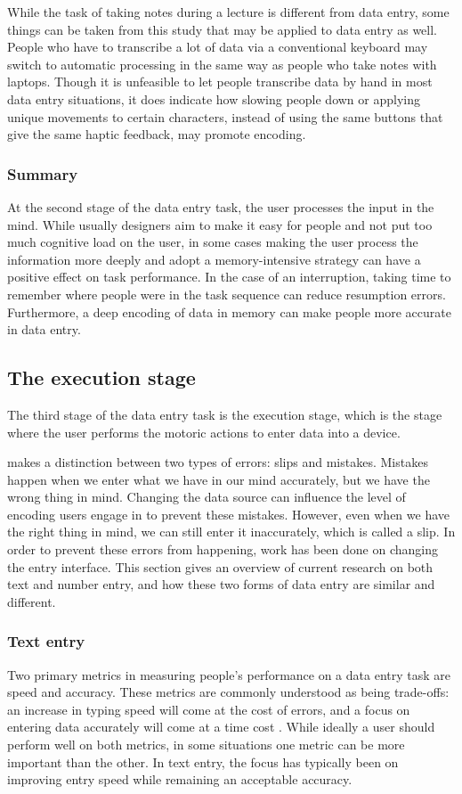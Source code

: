 \documentclass[11pt,oneside]{report}
\begin{document}
While the task of taking notes during a lecture is different from data entry, some things can be taken from this study that may be applied to data entry as well. 
People who have to transcribe a lot of data via a conventional keyboard may switch to automatic processing in the same way as people who take notes with laptops. Though it is unfeasible to let people transcribe data by hand in most data entry situations, it does indicate how slowing people down or applying unique movements to certain characters, instead of using the same buttons that give the same haptic feedback, may promote encoding.

\subsubsection{Summary}
At the second stage of the data entry task, the user processes the input in the mind. While usually designers aim to make it easy for people and not put too much cognitive load on the user, in some cases making the user process the information more deeply and adopt a memory-intensive strategy can have a positive effect on task performance. In the case of an interruption, taking time to remember where people were in the task sequence can reduce resumption errors. Furthermore, a deep encoding of data in memory can make people more accurate in data entry.

\subsection{The execution stage}
The third stage of the data entry task is the execution stage, which is the stage where the user performs the motoric actions to enter data into a device.

\citet{Reason1990} makes a distinction between two types of errors: slips and mistakes. Mistakes happen when we enter what we have in our mind accurately, but we have the wrong thing in mind. Changing the data source can influence the level of encoding users engage in to prevent these mistakes. However, even when we have the right thing in mind, we can still enter it inaccurately, which is called a slip. In order to prevent these errors from happening, work has been done on changing the entry interface. This section gives an overview of current research on both text and number entry, and how these two forms of data entry are similar and different.

\subsubsection{Text entry}
Two primary metrics in measuring people's performance on a data entry task are speed and accuracy. These metrics are commonly understood as being trade-offs: an increase in typing speed will come at the cost of errors, and a focus on entering data accurately will come at a time cost \citep{MacKenzie2002, Smith2008}.  While ideally a user should perform well on both metrics, in some situations one metric can be more important than the other. In text entry, the focus has typically been on improving entry speed while remaining an acceptable accuracy.
\end{document}
